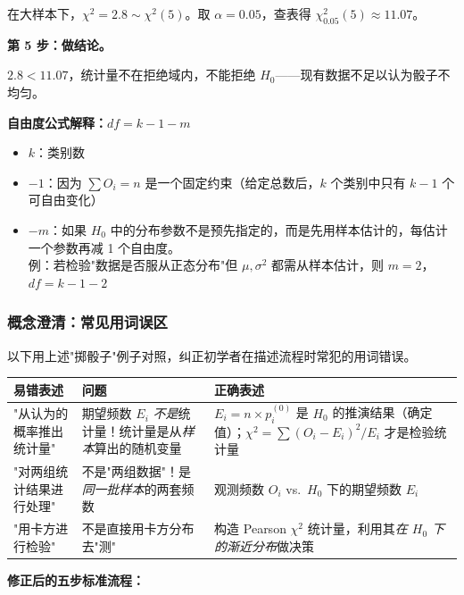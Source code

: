 在大样本下，$\chi^2 = 2.8 \sim \chi^2(5)$。取 $\alpha = 0.05$，查表得 $\chi^2_{0.05}(5) \approx 11.07$。

\textbf{第 5 步：做结论。}

$2.8 < 11.07$，统计量不在拒绝域内，不能拒绝 $H_0$——现有数据不足以认为骰子不均匀。

\medskip
\textbf{自由度公式解释：}$df = k - 1 - m$

\begin{itemize}
    \item $k$：类别数
    \item $-1$：因为 $\sum O_i = n$ 是一个固定约束（给定总数后，$k$ 个类别中只有 $k-1$ 个可自由变化）
    \item $-m$：如果 $H_0$ 中的分布参数不是预先指定的，而是先用样本估计的，每估计一个参数再减 1 个自由度。\\
    例：若检验"数据是否服从正态分布"但 $\mu, \sigma^2$ 都需从样本估计，则 $m = 2$，$df = k - 1 - 2$
\end{itemize}

\subsubsection{概念澄清：常见用词误区}

以下用上述"掷骰子"例子对照，纠正初学者在描述流程时常犯的用词错误。

\begin{center}
\footnotesize
\renewcommand{\arraystretch}{1.4}
\begin{tabular}{p{3.2cm}|p{3.8cm}|p{5.5cm}}
\toprule
\textbf{易错表述} & \textbf{问题} & \textbf{正确表述} \\
\midrule
"从认为的概率推出统计量" & 期望频数 $E_i$ \emph{不是}统计量！统计量是从\emph{样本}算出的随机变量
    & $E_i = n \times p_i^{(0)}$ 是 $H_0$ 的推演结果（确定值）；$\chi^2 = \sum (O_i-E_i)^2/E_i$ 才是检验统计量 \\
\midrule
"对两组统计结果进行处理" & 不是"两组数据"！是\emph{同一批样本}的两套频数
    & 观测频数 $O_i$ vs.\ $H_0$ 下的期望频数 $E_i$ \\
\midrule
"用卡方进行检验" & 不是直接用卡方分布去"测"
    & 构造 Pearson $\chi^2$ 统计量，利用其\emph{在 $H_0$ 下的渐近分布}做决策 \\
\bottomrule
\end{tabular}
\end{center}

\medskip
\textbf{修正后的五步标准流程：}


